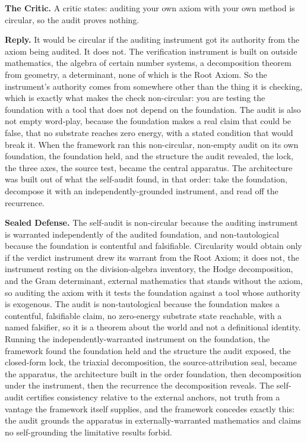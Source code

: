 \documentclass[10pt,twocolumn]{article}
\begin{document}
\textbf{The Critic.} A critic states: auditing your own axiom with your
own method is circular, so the audit proves nothing.

\textbf{Reply.} It would be circular if the auditing instrument got its
authority from the axiom being audited. It does not. The verification
instrument is built on outside mathematics, the algebra of certain
number systems, a decomposition theorem from geometry, a determinant,
none of which is the Root Axiom. So the instrument's authority comes
from somewhere other than the thing it is checking, which is exactly
what makes the check non-circular: you are testing the foundation with a
tool that does not depend on the foundation. The audit is also not empty
word-play, because the foundation makes a real claim that could be
false, that no substrate reaches zero energy, with a stated condition
that would break it. When the framework ran this non-circular, non-empty
audit on its own foundation, the foundation held, and the structure the
audit revealed, the lock, the three axes, the source test, became the
central apparatus. The architecture was built out of what the self-audit
found, in that order: take the foundation, decompose it with an
independently-grounded instrument, and read off the recurrence.

\textbf{Sealed Defense.} The self-audit is non-circular because the
auditing instrument is warranted independently of the audited
foundation, and non-tautological because the foundation is contentful
and falsifiable. Circularity would obtain only if the verdict instrument
drew its warrant from the Root Axiom; it does not, the instrument
resting on the division-algebra inventory, the Hodge decomposition, and
the Gram determinant, external mathematics that stands without the
axiom, so auditing the axiom with it tests the foundation against a tool
whose authority is exogenous. The audit is non-tautological because the
foundation makes a contentful, falsifiable claim, no zero-energy
substrate state reachable, with a named falsifier, so it is a theorem
about the world and not a definitional identity. Running the
independently-warranted instrument on the foundation, the framework
found the foundation held and the structure the audit exposed, the
closed-form lock, the triaxial decomposition, the source-attribution
seal, became the apparatus, the architecture built in the order
foundation, then decomposition under the instrument, then the recurrence
the decomposition reveals. The self-audit certifies consistency relative
to the external anchors, not truth from a vantage the framework itself
supplies, and the framework concedes exactly this: the audit grounds the
apparatus in externally-warranted mathematics and claims no
self-grounding the limitative results forbid.
\end{document}
